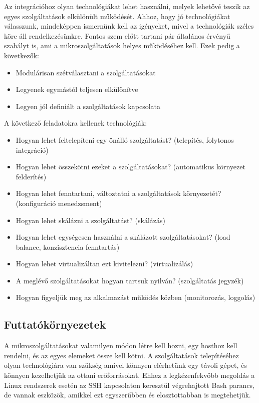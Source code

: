 \documentclass[11pt,magyar,a4paper,twoside,]{report}
\providecommand{\tightlist}{%
  \setlength{\itemsep}{0pt}\setlength{\parskip}{0pt}}
\begin{document}
Az integrációhoz olyan technológiákat\citep{micro-introPt1} lehet
használni, melyek lehetővé teszik az egyes szolgáltatások elkülönült
működését. Ahhoz, hogy jó technológiákat válasszunk, mindeképpen
ismernünk kell az igényeket, mivel a technológiák széles köre áll
rendelkezésünkre. Fontos szem előtt tartani pár általános érvényű
szabályt is\citep{micro-golden}, ami a mikroszolgáltatások helyes
működéséhez kell. Ezek pedig a következők:

\begin{itemize}
\tightlist
\item
  Modulárisan szétválasztani a szolgáltatásokat
\item
  Legyenek egymástól teljesen elkülönítve
\item
  Legyen jól definiált a szolgáltatások kapcsolata
\end{itemize}

A következő feladatokra kellenek technológiák:

\begin{itemize}
\tightlist
\item
  Hogyan lehet feltelepíteni egy önálló szolgáltatást? (telepítés,
  folytonos integráció)
\item
  Hogyan lehet összekötni ezeket a szolgáltatásokat? (automatikus
  környezet felderítés)
\item
  Hogyan lehet fenntartani, változtatni a szolgáltatások környezetét?
  (konfiguráció menedzsment)
\item
  Hogyan lehet skálázni a szolgáltatást? (skálázás)
\item
  Hogyan lehet egységesen használni a skálázott szolgáltatásokat? (load
  balance, konzisztencia fenntartás)
\item
  Hogyan lehet virtualizáltan ezt kivitelezni? (virtualizálás)
\item
  A meglévő szolgáltatásokat hogyan tartsuk nyilván? (szolgáltatás
  jegyzék)
\item
  Hogyan figyeljük meg az alkalmazást működés közben (monitorozás,
  loggolás)
\end{itemize}

\subsection{Futtatókörnyezetek}\label{futtatuxf3kuxf6rnyezetek}

A mikroszolgáltatásokat valamilyen módon létre kell hozni, egy hosthoz
kell rendelni, és az egyes elemeket össze kell kötni. A szolgáltatások
telepítéséhez olyan technológiára van szükség amivel könnyen elérhetünk
egy távoli gépet, és könnyen kezelhetjük az ottani erőforrásokat. Ehhez
a legkézenfekvőbb megoldás a Linux rendszerek esetén az SSH kapcsolaton
keresztül végrehajtott Bash parancs, de vannak eszközök, amikkel ezt
egyszerűbben és elosztottabban is megtehetjük.
\end{document}
